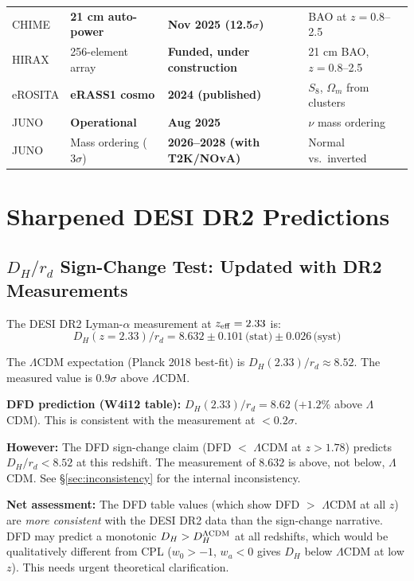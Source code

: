 \documentclass[11pt,a4paper]{article}
\newcommand{\LCDM}{$\Lambda$CDM}
\begin{document}
\begin{table}[H]
\begin{tabular}{llll}
CHIME & \textbf{21 cm auto-power} &
\textbf{Nov 2025 (12.5$\sigma$)} & BAO at $z = 0.8$--2.5 \\
HIRAX & 256-element array &
\textbf{Funded, under construction} & 21 cm BAO, $z = 0.8$--2.5 \\
eROSITA & \textbf{eRASS1 cosmo} &
\textbf{2024 (published)} & $S_8$, $\Omega_m$ from clusters \\
JUNO & \textbf{Operational} &
\textbf{Aug 2025} & $\nu$ mass ordering \\
JUNO & Mass ordering ($3\sigma$) &
\textbf{2026--2028 (with T2K/NOvA)} & Normal vs.\ inverted \\
\bottomrule
\end{tabular}
\end{table}

\section{Sharpened DESI DR2 Predictions}
\label{sec:desi_sharp}

\subsection{$D_H/r_d$ Sign-Change Test: Updated with DR2 Measurements}

\begin{tensionbox}

The DESI DR2 Lyman-$\alpha$ measurement at $z_{\rm eff} = 2.33$ is:
\begin{equation}
D_H(z = 2.33)/r_d = 8.632 \pm 0.101\,\text{(stat)} \pm 0.026\,\text{(syst)}
\end{equation}

The \LCDM{} expectation (Planck 2018 best-fit) is
$D_H(2.33)/r_d \approx 8.52$. The measured value is $0.9\sigma$ above
\LCDM.

\textbf{DFD prediction (W4i12 table):} $D_H(2.33)/r_d = 8.62$
($+1.2\%$ above \LCDM). This is consistent with the measurement at
$<0.2\sigma$.

\textbf{However:} The DFD sign-change claim (DFD $<$ \LCDM{} at
$z > 1.78$) predicts $D_H/r_d < 8.52$ at this redshift. The measurement
of $8.632$ is above, not below, \LCDM. See \S\ref{sec:inconsistency}
for the internal inconsistency.

\textbf{Net assessment:} The DFD table values (which show DFD $>$ \LCDM
at all $z$) are \emph{more consistent} with the DESI DR2 data than the
sign-change narrative. DFD may predict a monotonic $D_H > D_H^{\Lambda\rm CDM}$
at all redshifts, which would be qualitatively different from CPL
($w_0 > -1$, $w_a < 0$ gives $D_H$ below \LCDM{} at low $z$). This
needs urgent theoretical clarification.
\end{tensionbox}
\end{document}
